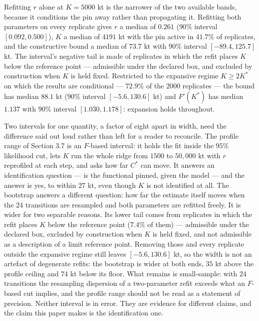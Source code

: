 \documentclass[11pt]{article}
\begin{document}
Refitting \(r\) alone at \(K = 5000\) kt is the narrower of the two
available bands, because it conditions the pin away rather than propagating
it. Refitting both parameters on every replicate gives \(r\) a median of
\(0.261\) (\(90\%\) interval \([0.092, 0.500]\)), \(K\) a median of
\(4191\) kt with the pin active in \(41.7\%\) of replicates, and the
constructive bound a median of \(73.7\) kt with \(90\%\) interval
\([-89.4, 125.7]\) kt. The interval's negative tail is made of replicates in
which the refit places \(K\) below the reference point --- admissible under
the declared box, and excluded by construction when \(K\) is held fixed.
Restricted to the expansive regime \(K \ge 2K^*\) on which the results are
conditional --- \(72.9\%\) of the \(2000\) replicates --- the bound has
median \(88.1\) kt (\(90\%\) interval
\([-5.6, 130.6]\) kt) and \(F'(K^*)\) has median \(1.137\) with
\(90\%\) interval \([1.030, 1.178]\): expansion holds throughout.

Two intervals for one quantity, a factor of eight apart in width, need
the difference said out loud rather than left for a reader to reconcile.
The profile range of Section 3.7 is an \(F\)-based interval: it holds
the fit inside the \(95\%\) likelihood cut, lets \(K\) run the whole
ridge from \(1500\) to \(50{,}000\) kt with \(r\) reprofiled at each
step, and asks how far \(C^*\) can move. It answers an identification
question --- is the functional pinned, given the model --- and the answer
is yes, to within \(27\) kt, even though \(K\) is not identified at
all. The bootstrap answers a different question: how far the estimate
itself moves when the \(24\) transitions are resampled and both
parameters are refitted freely. It is wider for two separable reasons.
Its lower tail comes from replicates in which the refit places \(K\)
below the reference point (\(7.4\%\) of them) --- admissible under the
declared box, excluded by construction when \(K\) is held fixed, and
not admissible as a description of a limit reference point. Removing
those and every replicate outside the expansive regime still leaves
\([-5.6, 130.6]\) kt, so the width is not an artefact of degenerate
refits: the bootstrap is wider at both ends, \(35\) kt above the profile
ceiling and \(74\) kt below its floor. What remains is small-sample:
with \(24\) transitions the resampling dispersion of a two-parameter
refit exceeds what an \(F\)-based cut implies, and the profile range
should not be read as a statement of precision. Neither interval is in
error. They are evidence for different claims, and the claim this paper
makes is the identification one.
\end{document}
